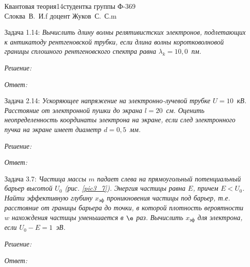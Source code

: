 




\newcommand{\comm}[2]{\left[#1,\ #2\right]}
\newcommand{\h}{\hbar}
\newcommand{\ds}{\displaystyle}


{Квантовая теория}{}{14}{студентка группы Ф-369\\Слоква~В.~И.}{f}
{доцент Жуков~С.~С.}{m}
\newpage

Задача 1.14: \emph{Вычислить длину волны релятивистских электронов, подлетающих
к антикатоду рентгеновской трубки, если длина волны коротковолновой границы
сплошного рентгеновского спектра равна \( \lambda_k = 10,\!0 \)~пм.}

\vspace*{2em}
\emph{Решение:}

\vspace*{2em}
\emph{Ответ:}

\newpage

Задача 2.14: \emph{Ускоряющее напряжение на электронно-лучевой трубке
\( U = 10 \)~кВ. Расстояние от электронной пушки до экрана \( l = 20 \)~см.
Оценить неопределенность координаты электрона на экране, если след электронного
пучка на экране имеет диаметр \( d = 0,\!5 \)~мм.}

\vspace*{2em}
\emph{Решение:}

\vspace*{2em}
\emph{Ответ:}

\newpage

Задача 3.7: \emph{Частица массы \( m \) падает слева на прямоугольный
потенциальный барьер высотой \( U_0 \) (рис. \ref{pic3_7}). Энергия частицы
равна \( E \), причем \( E < U_0 \). Найти эффективную глубину
\( x_\text{эф} \) проникновения частицы под барьер, т.е. расстояние от границы
барьера до точки, в которой плотность вероятности \( w \) нахождения частицы
уменьшается в \( \e \) раз. Вычислить \( x_\text{эф} \) для электрона, если
\( U_0 - E = 1 \)~эВ.}

\vspace*{2em}
\emph{Решение:}

\vspace*{2em}
\emph{Ответ:}


